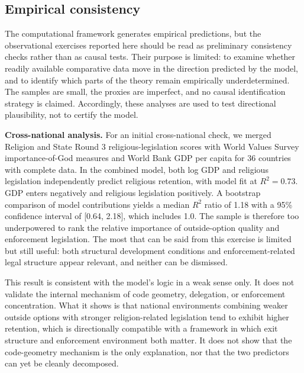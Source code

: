 \documentclass[12pt]{article}
\begin{document}
\subsection{Empirical consistency}

The computational framework generates empirical predictions, but the observational exercises reported here should be read as preliminary consistency checks rather than as causal tests. Their purpose is limited: to examine whether readily available comparative data move in the direction predicted by the model, and to identify which parts of the theory remain empirically underdetermined. The samples are small, the proxies are imperfect, and no causal identification strategy is claimed. Accordingly, these analyses are used to test directional plausibility, not to certify the model.

\noindent\textbf{Cross-national analysis.}
For an initial cross-national check, we merged Religion and State Round 3 religious-legislation scores with World Values Survey importance-of-God measures and World Bank GDP per capita for 36 countries with complete data. In the combined model, both log GDP and religious legislation independently predict religious retention, with model fit at $R^2 = 0.73$. GDP enters negatively and religious legislation positively. A bootstrap comparison of model contributions yields a median $R^2$ ratio of 1.18 with a 95\% confidence interval of [0.64, 2.18], which includes 1.0. The sample is therefore too underpowered to rank the relative importance of outside-option quality and enforcement legislation. The most that can be said from this exercise is limited but still useful: both structural development conditions and enforcement-related legal structure appear relevant, and neither can be dismissed.

This result is consistent with the model's logic in a weak sense only. It does not validate the internal mechanism of code geometry, delegation, or enforcement concentration. What it shows is that national environments combining weaker outside options with stronger religion-related legislation tend to exhibit higher retention, which is directionally compatible with a framework in which exit structure and enforcement environment both matter. It does not show that the code-geometry mechanism is the only explanation, nor that the two predictors can yet be cleanly decomposed.
\end{document}
